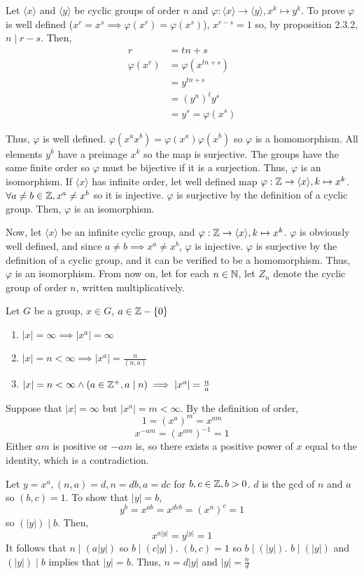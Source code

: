 \documentclass{report}
\newcommand{\mprop}[2]{\begin{Prop}{#1}{}#2\end{Prop}}
\newenvironment{myproof}[1][\proofname]{%
	\proof[\bfseries #1: ]%
}{\endproof}
\begin{document}
\begin{myproof}
    Let $\langle x \rangle $ and $\langle y \rangle$ be cyclic groups of order $n$ and $\varphi: \langle x \rangle \to \langle y \rangle, x^k \mapsto y^k$. To prove $\varphi$ is well defined ($x^r = x^s \implies \varphi (x^r) = \varphi (x^s)$), $x^{r-s} = 1$ so, by proposition 2.3.2, $n \mid r - s$. Then, 
    \begin{align*}
        r &= tn + s\\
        \varphi(x^r) &= \varphi (x^{tn+s})\\
        & = y^{tn+s}\\
        &= (y^n)^t y^s\\
        &= y^s = \varphi (x^s)
    \end{align*}
    
    Thus, $\varphi$ is well defined. $\varphi (x^a x^b) = \varphi(x^a) \varphi(x^b)$ so $\varphi$ is a homomorphism. All elements $y^k$ have a preimage $x^k$ so the map is surjective. The groups have the same finite order so $\varphi$ must be bijective if it is a surjection. Thus, $\varphi$ is an isomorphism. 
    If $\langle x \rangle$ has infinite order, let well defined map $\varphi : \mathbb{Z} \to \langle x \rangle , k \mapsto x^k$. $\forall a \neq b \in \mathbb{Z}, x^a \neq x^b$ so it is injective. $\varphi$ is surjective by the definition of a cyclic group. Then, $\varphi$ is an isomorphism. 
    
    Now, let $\langle x \rangle$ be an infinite cyclic group, and $\varphi : \mathbb{Z} \to \langle x \rangle , k \mapsto x^k$. $\varphi$ is obviously well defined, and since $a \neq b \implies x^a \neq x^b$, $\varphi$ is injective. $\varphi$ is surjective by the definition of a cyclic group, and it can be verified to be a homomorphism. Thus, $\varphi$ is an isomorphism. 
\end{myproof}
From now on, let for each $n \in \mathbb{N}$, let $Z_n$ denote the cyclic group of order $n$, written multiplicatively. 
\mprop{}{Let $G$ be a group, $x \in G$, $a \in \mathbb{Z} - \{ 0 \}$
\begin{enumerate}
    \item $|x| = \infty \implies | x^a | = \infty$
    \item $|x | = n < \infty \implies |x^a| = \frac{n}{(n,a)}$
    \item $|x| = n < \infty \land (a \in \mathbb{Z}^+, a \mid n) \implies |x^a| = \frac{n}{a}$
\end{enumerate}}
\begin{myproof}
    Suppose that $|x| = \infty$ but $|x^a | = m < \infty$. By the definition of order,
    $$1 = (x^a)^m = x^{am}$$
    $$x^{-am} = (x^{am})^{-1} =1$$
    Either $am$ is positive or $-am$ is, so there exists a positive power of $x$ equal to the identity, which is a contradiction. 

    Let $y = x^a, (n,a) = d, n = db, a = dc$ for $b,c \in \mathbb{Z}, b> 0$. $d$ is the gcd of $n$ and $a$ so $(b,c) = 1$. To show that $|y| = b$, 
    $$y^b = x^{ab} = x^{dcb} = (x^n)^c = 1$$
    so $(|y|) \mid b$. Then, 
    $$x^{a|y|} = y^{|y|} = 1$$
    It follows that $n \mid (a|y|)$ so $b \mid (c |y|)$. $(b,c) = 1$ so $b \mid (|y|)$. $b \mid (|y|)$ and $(|y|) \mid b$ implies that $|y| = b$. Thus, $n = d|y|$ and $|y| = \frac{n}{d}$
\end{myproof}
\end{document}
